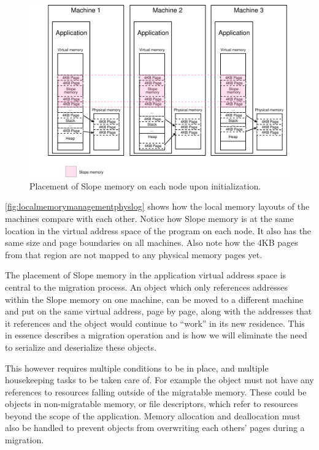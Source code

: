 \begin{figure}[t]
\centering
{}
\includegraphics[width=1\textwidth]{local-memory-management-phys-log.drawio}
\caption{
    Placement of Slope memory on each node upon initialization.
}
\label{fig:localmemorymanagementphyslog}
\end{figure}

\autoref{fig:localmemorymanagementphyslog} shows how the local memory layouts
of the machines compare with each other. Notice how Slope memory is at the
same location in the virtual address space of the program on each node.
It also has the same size and page boundaries on all machines. Also note how
the 4KB pages from that region are not mapped to any physical memory pages
yet.

The placement of Slope memory in the application virtual address space is
central to the migration process. An object which only references addresses
within the Slope memory on one machine, can be moved to a different machine
and put on the same virtual address, page by page, along with the addresses
that it references and the object would continue to ``work'' in its new
residence. This in essence describes a migration operation and is how we will
eliminate the need to serialize and deserialize these objects.

This however requires multiple conditions to be in place, and multiple
housekeeping tasks to be taken care of. For example the object must not have
any references to resources falling outside of the migratable memory. These
could be objects in non-migratable memory, or file descriptors, which refer
to resources beyond the scope of the application. Memory allocation
and deallocation must also be handled to prevent objects from overwriting each
others' pages during a migration.

